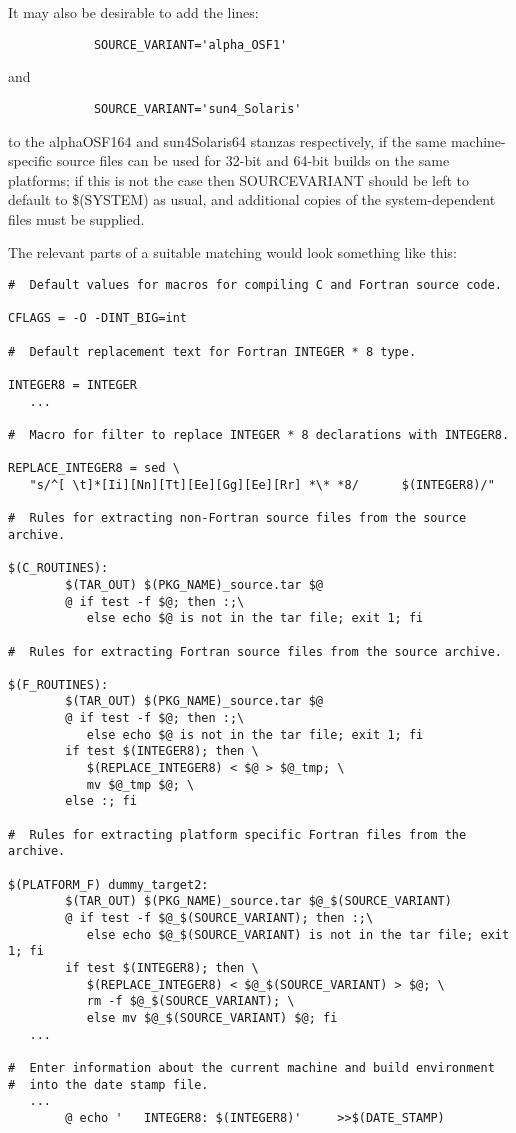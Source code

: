 \documentclass[twoside,11pt]{article}
\renewcommand{\_}{\texttt{\symbol{95}}}
\begin{document}
It may also be desirable to add the lines:
\begin{squote}
\begin{verbatim}
            SOURCE_VARIANT='alpha_OSF1'
\end{verbatim}
\end{squote}
and 
\begin{squote}
\begin{verbatim}
            SOURCE_VARIANT='sun4_Solaris'
\end{verbatim}
\end{squote}
to the alpha\_OSF1\_64 and sun4\_Solaris\_64 stanzas respectively,
if the same
machine-specific source files can be used for 32-bit and 64-bit 
builds on the same platforms; if this is not the case then SOURCE\_VARIANT
should be left to default to \$(SYSTEM) as usual,
and additional copies of the system-dependent files must be supplied.

The relevant parts of a suitable matching  would look 
something like this:
\begin{squote}
\begin{verbatim}
#  Default values for macros for compiling C and Fortran source code.

CFLAGS = -O -DINT_BIG=int

#  Default replacement text for Fortran INTEGER * 8 type.

INTEGER8 = INTEGER
   ...

#  Macro for filter to replace INTEGER * 8 declarations with INTEGER8.

REPLACE_INTEGER8 = sed \
   "s/^[ \t]*[Ii][Nn][Tt][Ee][Gg][Ee][Rr] *\* *8/      $(INTEGER8)/"

#  Rules for extracting non-Fortran source files from the source archive.

$(C_ROUTINES):
        $(TAR_OUT) $(PKG_NAME)_source.tar $@
        @ if test -f $@; then :;\
           else echo $@ is not in the tar file; exit 1; fi

#  Rules for extracting Fortran source files from the source archive.

$(F_ROUTINES):
        $(TAR_OUT) $(PKG_NAME)_source.tar $@
        @ if test -f $@; then :;\
           else echo $@ is not in the tar file; exit 1; fi
        if test $(INTEGER8); then \
           $(REPLACE_INTEGER8) < $@ > $@_tmp; \
           mv $@_tmp $@; \
        else :; fi

#  Rules for extracting platform specific Fortran files from the archive.

$(PLATFORM_F) dummy_target2:
        $(TAR_OUT) $(PKG_NAME)_source.tar $@_$(SOURCE_VARIANT)
        @ if test -f $@_$(SOURCE_VARIANT); then :;\
           else echo $@_$(SOURCE_VARIANT) is not in the tar file; exit 1; fi
        if test $(INTEGER8); then \
           $(REPLACE_INTEGER8) < $@_$(SOURCE_VARIANT) > $@; \
           rm -f $@_$(SOURCE_VARIANT); \
           else mv $@_$(SOURCE_VARIANT) $@; fi
   ...

#  Enter information about the current machine and build environment
#  into the date stamp file.
   ...
        @ echo '   INTEGER8: $(INTEGER8)'     >>$(DATE_STAMP)
\end{verbatim}
\end{squote}
\end{document}
